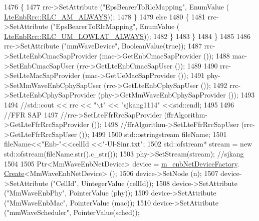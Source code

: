 \begin{DoxyCode}
1476                         \{
1477                                 rrc->SetAttribute (\textcolor{stringliteral}{"EpsBearerToRlcMapping"}, EnumValue (
      \hyperlink{classns3_1_1LteEnbRrc_a1c748bf2d69860b866dfda2a38427842a3cdf85c3ca2f87b1775fde37d95d0ace}{LteEnbRrc::RLC\_AM\_ALWAYS}));
1478                         \}
1479                         \textcolor{keywordflow}{else}
1480                         \{
1481                                 rrc->SetAttribute (\textcolor{stringliteral}{"EpsBearerToRlcMapping"}, EnumValue (
      \hyperlink{classns3_1_1LteEnbRrc_a1c748bf2d69860b866dfda2a38427842a57f0cbeb7cbaf285166a276e0572c8f4}{LteEnbRrc::RLC\_UM\_LOWLAT\_ALWAYS}));
1482                         \}
1483                 \}
1484         \}
1485 
1486         rrc->SetAttribute (\textcolor{stringliteral}{"mmWaveDevice"}, BooleanValue(\textcolor{keyword}{true}));
1487         rrc->SetLteEnbCmacSapProvider (mac->GetEnbCmacSapProvider ());
1488         mac->SetEnbCmacSapUser (rrc->GetLteEnbCmacSapUser ());
1489 
1490         rrc->SetLteMacSapProvider (mac->GetUeMacSapProvider ());
1491         phy->SetMmWaveEnbCphySapUser (rrc->GetLteEnbCphySapUser ());
1492         rrc->SetLteEnbCphySapProvider (phy->GetMmWaveEnbCphySapProvider ());
1493 
1494         \textcolor{comment}{//std::cout << rrc << "\(\backslash\)t" << "sjkang1114" <<std::endl;}
1495 
1496         \textcolor{comment}{//FFR SAP}
1497         \textcolor{comment}{//rrc->SetLteFfrRrcSapProvider (ffrAlgorithm->GetLteFfrRrcSapProvider ());}
1498         \textcolor{comment}{//ffrAlgorithm->SetLteFfrRrcSapUser (rrc->GetLteFfrRrcSapUser ());}
1499 
1500         std::ostringstream fileName;
1501                 fileName<<\textcolor{stringliteral}{"Enb-"}<<cellId <<\textcolor{stringliteral}{"-Ul-Sinr.txt"};
1502                  std::ofstream* stream = \textcolor{keyword}{new} std::ofstream(fileName.str().c\_str());
1503                  phy->SetStream(stream); \textcolor{comment}{//sjkang}
1504 
1505         Ptr<MmWaveEnbNetDevice> device = \hyperlink{classns3_1_1MmWaveHelper_adaf4ba456a6dda3d359b5105a0df1c22}{m\_enbNetDeviceFactory}.
      \hyperlink{classns3_1_1ObjectFactory_a18152e93f0a6fe184ed7300cb31e9896}{Create}<MmWaveEnbNetDevice> ();
1506         device->SetNode (n);
1507         device->SetAttribute (\textcolor{stringliteral}{"CellId"}, UintegerValue (cellId));
1508         device->SetAttribute (\textcolor{stringliteral}{"MmWaveEnbPhy"}, PointerValue (phy));
1509         device->SetAttribute (\textcolor{stringliteral}{"MmWaveEnbMac"}, PointerValue (mac));
1510         device->SetAttribute (\textcolor{stringliteral}{"mmWaveScheduler"}, PointerValue(sched));

\end{DoxyCode}
